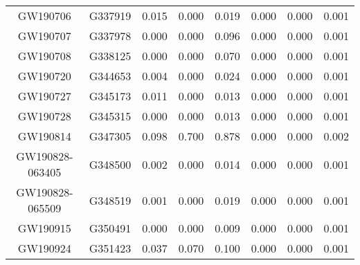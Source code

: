 \begin{table}[]
\begin{tabular}{c|c|ccr|ccr}
GW190706                      & G337919               & 0.015                   & 0.000                    & 0.019                   & 0.000                   & 0.000                    & 0.001                   \\
GW190707                      & G337978               & 0.000                   & 0.000                    & 0.096                   & 0.000                   & 0.000                    & 0.001                   \\
GW190708                      & G338125               & 0.000                   & 0.000                    & 0.070                   & 0.000                   & 0.000                    & 0.001                   \\
GW190720                      & G344653               & 0.004                   & 0.000                    & 0.024                   & 0.000                   & 0.000                    & 0.001                   \\
GW190727                      & G345173               & 0.011                   & 0.000                    & 0.013                   & 0.000                   & 0.000                    & 0.001                   \\
GW190728                      & G345315               & 0.000                   & 0.000                    & 0.013                   & 0.000                   & 0.000                    & 0.001                   \\
GW190814                      & G347305               & 0.098                   & 0.700                    & 0.878                   & 0.000                   & 0.000                    & 0.002                   \\
GW190828-063405               & G348500               & 0.002                   & 0.000                    & 0.014                   & 0.000                   & 0.000                    & 0.001                   \\
GW190828-065509               & G348519               & 0.001                   & 0.000                    & 0.019                   & 0.000                   & 0.000                    & 0.001                   \\
GW190915                      & G350491               & 0.000                   & 0.000                    & 0.009                   & 0.000                   & 0.000                    & 0.001                   \\
GW190924                      & G351423               & 0.037                   & 0.070                    & 0.100                   & 0.000                   & 0.000                    & 0.001                   \\

\end{tabular}
\end{table}
